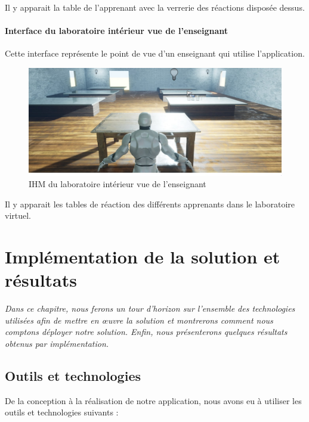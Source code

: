 Il y apparait la table de l'apprenant avec la verrerie des réactions disposée dessus.

\subsubsection{Interface du laboratoire intérieur vue de l'enseignant}

Cette interface représente le point de vue d'un enseignant qui utilise l'application.

\begin{figure}[H]
	\centering
	\includegraphics[width=1\textwidth]{img/labo3}
	\caption{IHM du laboratoire intérieur vue de l'enseignant}
	\label{fig:mesh1}
\end{figure}

Il y apparait les tables de réaction des différents apprenants dans le laboratoire virtuel.


\chapter{Implémentation de la solution et résultats}
\textit{Dans ce chapitre, nous ferons un tour d’horizon sur l’ensemble des technologies utilisées
	afin de mettre en œuvre la solution et montrerons comment nous comptons déployer notre
	solution. Enfin, nous présenterons quelques résultats obtenus par implémentation.}
\clearpage

\section{Outils et technologies}

De la conception à la réalisation de notre application, nous avons eu à utiliser les outils et technologies suivants :

